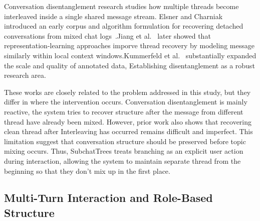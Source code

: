 \documentclass[pdflatex,sn-mathphys-num]{sn-jnl}%
\theoremstyle{thmstyleone}%
\theoremstyle{thmstyletwo}%
\theoremstyle{thmstylethree}%
\begin{document}
Conversation disentanglement research studies how multiple threads become interleaved inside a single shared message stream. Elsner and Charniak introduced an early corpus and algorithm formulation for recovering detached conversations from mixed chat logs~\cite{elsner2008talking}.Jiang et al.~\cite{jiang2018disentangle} later showed that representation-learning approaches imporve thread recovery by modeling message similarly within local context windows.Kummerfeld et al.~\cite{kummerfeld2019disentanglement} substantially expanded the scale and quality of annotated data, Establishing disentanglement as a robust research area.








These works are closely related to the problem addressed in this study, but they differ in where the intervention occurs. Conversation disentanglement is mainly reactive, the system tries to recover structure after the message from different thread have already been mixed. However, prior work also shows that recovering clean thread after Interleaving has occurred remains difficult and imperfect. This limitation suggest that conversation structure should be preserved before topic mixing occurs. Thus, SubchatTrees treats branching as an explicit user action during interaction, allowing the system to maintain separate thread from the beginning so that they don't mix up in the first place. 



\subsection{Multi-Turn Interaction and Role-Based Structure}\label{subsec:multi_turn}
\end{document}
